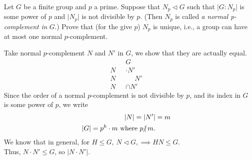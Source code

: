 \documentclass{article}
\begin{document}
\maketitle

\pagebreak

\begin{homeworkProblem}
    Let $G$ be a finite group and $p$ a prime.
    Suppose that $N_p \lhd G$ such that
    $\lvert G:N_p \rvert$ is some power of $p$ and 
    $\lvert N_p \rvert$ is not divisible by $p$.
    (Then $N_p$ is called \textit{a normal p-complement in} $G$.)
    Prove that (for the give $p$) $N_p$ is unique,
    i.e., a group can have at most one normal $p$-complement.\\
    \solution 

    Take normal $p$-complement $N$ and $N'$ in $G$, we show that
    they are actually equal.
    \begin{align}
        &G\\
        N &\cdot N' \\
        N \ \ \ & \ \ \ \ \ \ N'\\
        N &\cap N'
    \end{align}
    Since the order of a normal $p$-complement is not divisible by $p$,
    and its index in $G$ is some power of $p$, we write 
    \begin{align}
        \lvert N \rvert = \lvert N' \rvert &= m \\
        \lvert G \rvert = p^k \cdot m \ \text{where} \ p \hspace{-4pt}\not| \hspace{2pt} m.
    \end{align}
    We know that in general, for $H \leq G, \ N \lhd G, \implies HN \leq G$.\\
    Thus, $N \cdot N' \leq G$, so $\lvert N \cdot N'\rvert$.\\


\end{homeworkProblem}
\end{document}

